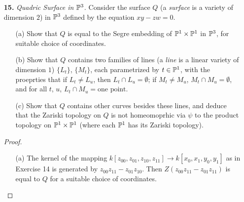 \documentclass{article}
\begin{document}
\begin{enumerate} [label=\textbf{\arabic*.}, leftmargin=0cm]
\item[\textbf{15.}] \textit{Quadric Surface in $\mathbb{P}^3$.} Consider the surface $Q$ (a \textit{surface} is a variety of dimension $2$) in $\mathbb{P}^3$ defined by the equation $xy - zw = 0$. 
\begin{itemize}
    \item[(a)] Show that $Q$ is equal to the Segre embedding of $\mathbb{P}^1 \times \mathbb{P}^1$ in $\mathbb{P}^3$, for suitable choice of coordinates.
    \item[(b)] Show that $Q$ contains two families of lines (a \textit{line} is a linear variety of dimension $1$) $\{ L_t \}$, $\{ M_t \}$, each parametrized by $t \in \mathbb{P}^1$, with the proeprties that if $L_t \neq L_u$, then $L_t \cap L_u = \emptyset$; if $M_t \neq M_u$, $M_t \cap M_u = \emptyset$, and for all $t$, $u$, $L_t \cap M_u = \text{one point}$.
    \item[(c)] Show that $Q$ contains other curves besides these lines, and deduce that the Zariski topology on $Q$ is not homeomoprhic via $\psi$ to the product topology on $\mathbb{P}^1 \times \mathbb{P}^1$ (where each $\mathbb{P}^1$ has its Zariski topology).
\end{itemize}

\begin{proof} $ $ \vspace{0pt}
    \begin{itemize} [leftmargin=0cm]
        \item[(a)] The kernel of the mapping $k[z_{00}, z_{01}, z_{10}, z_{11}] \to k[x_0, x_1, y_0, y_1]$ as in Exercise 14 is generated by $z_{00} z_{11} - z_{01} z_{10}$. Then $Z(z_{00} z_{11} - z_{01} z_{11})$ is equal to $Q$ for a suitable choice of coordinates.


\end{itemize}
\end{proof}
\end{enumerate}
\end{document}
